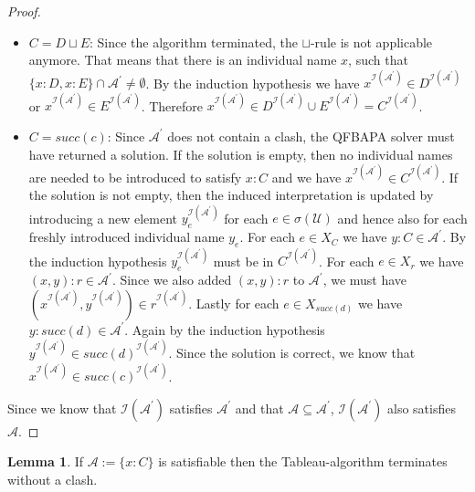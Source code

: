 \documentclass{book}
\theoremstyle{break}
\theoremstyle{definition}
\newtheorem{mylem}{Lemma}
\begin{document}
\begin{proof}
\begin{itemize}
\item $C=D\sqcup E$: Since the algorithm terminated, the $\sqcup$-rule is not applicable anymore. That means that there is an individual name $x$, such that $\{x:D, x:E\}\cap \mathcal{A}^\prime\neq \emptyset$. By the induction hypothesis we have $x^{\mathcal{I}(\mathcal{A}^\prime)}\in D^{\mathcal{I}(\mathcal{A}^\prime)}$ or $x^{\mathcal{I}(\mathcal{A}^\prime)}\in E^{\mathcal{I}(\mathcal{A}^\prime)}$. Therefore $x^{\mathcal{I}(\mathcal{A}^\prime)}\in D^{\mathcal{I}(\mathcal{A}^\prime)}\cup E^{\mathcal{I}(\mathcal{A}^\prime)}=C^{\mathcal{I}(\mathcal{A}^\prime)}$.
\item $C=succ(c)$: Since $\mathcal{A}^\prime$ does not contain a clash, the QFBAPA solver must have returned a solution. If the solution is empty, then no individual names are needed to be introduced to satisfy $x:C$ and we have $x^{\mathcal{I}(\mathcal{A}^\prime)}\in C^{\mathcal{I}(\mathcal{A}^\prime)}$. If the solution is not empty, then the induced interpretation is updated by introducing a new element $y_e^{\mathcal{I}(\mathcal{A}^\prime)}$ for each $e\in \sigma(\mathcal{U})$ and hence also for each freshly introduced individual name $y_e$. For each $e\in X_C$ we have $y:C\in \mathcal{A}^\prime$. By the induction hypothesis $y_e^{\mathcal{I}(\mathcal{A}^\prime)}$ must be in $C^{\mathcal{I}(\mathcal{A}^\prime)}$. For each $e\in X_r$ we have $(x,y):r\in\mathcal{A}^\prime$. Since we also added $(x,y):r$ to $\mathcal{A}^\prime$, we must have $(x^{\mathcal{I}(\mathcal{A}^\prime)},y^{\mathcal{I}(\mathcal{A}^\prime)})\in r^{\mathcal{I}(\mathcal{A}^\prime)}$. Lastly for each $e\in X_{succ(d)}$ we have $y:succ(d)\in\mathcal{A}^\prime$. Again by the induction hypothesis $y^{\mathcal{I}(\mathcal{A}^\prime)}\in succ(d)^{\mathcal{I}(\mathcal{A}^\prime)}$. Since the solution is correct, we know that $x^{\mathcal{I}(\mathcal{A}^\prime)}\in succ(c)^{\mathcal{I}(\mathcal{A}^\prime)}$.
\end{itemize}
Since we know that $\mathcal{I}(\mathcal{A}^\prime)$ satisfies $\mathcal{A}^\prime$ and that $\mathcal{A}\subseteq \mathcal{A}^\prime$, $\mathcal{I}(\mathcal{A}^\prime)$ also satisfies $\mathcal{A}$.
\end{proof}
\begin{mylem}
If $\mathcal{A}:=\{x:C\}$ is satisfiable then the Tableau-algorithm terminates without a clash.
\end{mylem}
\end{document}
